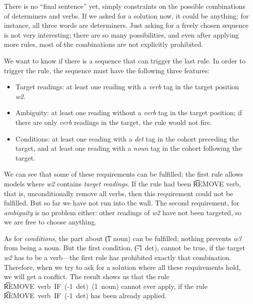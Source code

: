 There is no ``final sentence'' yet, simply constraints on the possible combinations of determiners and verbs. If we asked for a solution now, it could be anything; for instance, all three words are determiners. Just asking for a freely chosen sequence is not very interesting; there are so many possibilities, and even after applying more rules, most of the combinations are not explicitly prohibited.

We want to know if there is a sequence that can trigger the last rule.
In order to trigger the rule, the sequence must have the following three features:
\begin{itemize}
\item Target readings: at least one reading with a \emph{verb} tag in the target position {\em w2}.
\item Ambiguity: at least one reading without a \emph{verb} tag in the target position; if there are only \emph{verb} readings in the target, the rule would not fire.
\item Conditions: at least one reading with a \emph{det} tag in the cohort preceding the target, and at least one reading with a \emph{noun} tag in the cohort following the target.
\end{itemize}


We can see that some of these requirements can be fulfilled: the first rule allows models where {\em w2} contains \emph{target readings}. If the rule had been \t{REMOVE verb}, that is, unconditionally remove all verbs, then this requirement could not be fulfilled. But so far we have not run into the wall.
The second requirement, for \emph{ambiguity} is no problem either: other readings of {\em w2} have not been targeted, so we are free to choose anything.

As for \emph{conditions}, the part about \t{(1 noun)} can be fulfilled; nothing prevents {\em w3} from being a noun. But the first condition, \t{(-1 det)}, cannot be true, if the target {\em w2} has to be a verb---the first rule has prohibited exactly that combination.
Therefore, when we try to ask for a solution where all these requirements hold, we will get a conflict. The result shows us that the rule \t{REMOVE~verb~IF~(-1~det)~(1~noun)} cannot ever apply, if the rule \t{REMOVE~verb~IF~(-1~det)} has been already applied.

